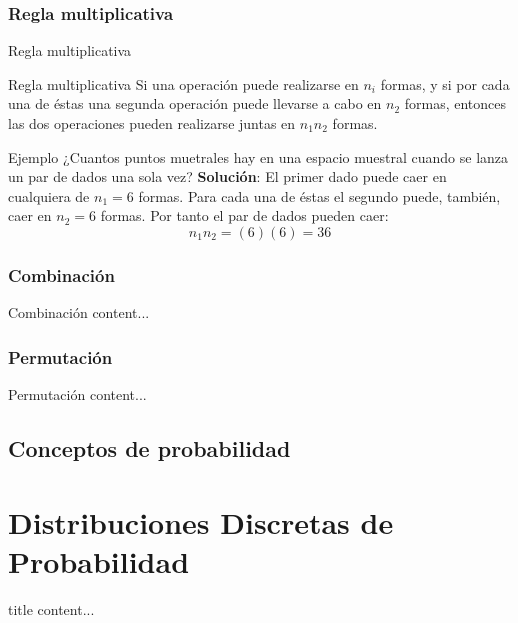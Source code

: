 \documentclass[11pt]{beamer}
\begin{document}
        \subsubsection*{Regla multiplicativa}
          \begin{frame}{Regla multiplicativa}
            \begin{block}{Regla multiplicativa}
                Si una operación puede realizarse en $n_i$ formas, y si por cada una de éstas una segunda operación puede llevarse a cabo en $n_2$ formas, entonces las dos operaciones pueden realizarse juntas en $n_1n_2$ formas.
            \end{block}
            \begin{block}{Ejemplo}
                ¿Cuantos puntos muetrales hay en una espacio muestral cuando se lanza un par de dados una sola vez?
                \pause
                \textbf{Solución}: El primer dado puede caer en cualquiera de $n_1 = 6$ formas. Para cada una de éstas el segundo puede, también, caer en $n_2 = 6$ formas. Por tanto el par de dados pueden caer:
                $$ n_1n_2 = (6)(6) = 36 $$
            \end{block}
          \end{frame}
        \subsubsection*{Combinación}
          \begin{frame}{Combinación}
            content...
          \end{frame}
        \subsubsection*{Permutación}
          \begin{frame}{Permutación}
            content...
          \end{frame}


      \subsection*{Conceptos de probabilidad}

    \section*{Distribuciones Discretas de Probabilidad}
    \begin{frame}{title}
        content...
    \end{frame}
\end{document}
